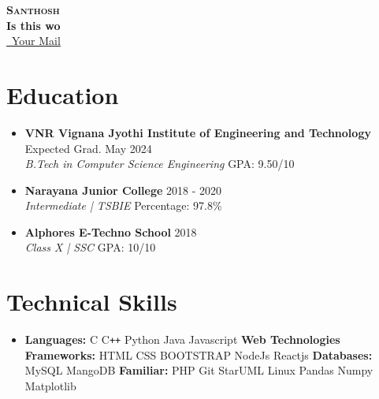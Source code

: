 \documentclass[letterpaper,5pt]{article}
\begin{document}
    \begin{center}
      \textbf{\Huge \scshape Santhosh} \\ \vspace{5pt}
      \textbf{\large Is this wo} \\ \vspace{2pt}
      \href{mailto:mail@mail.com}{\raisebox{-0.05\height}\faEnvelope \ Your Mail} 
       \
       \
       \
    \end{center}

    
    \section{Education}
    \begin{itemize}
        \item
            \textbf{VNR Vignana Jyothi Institute of Engineering and Technology} \hfill Expected Grad. May 2024 \\
            \textit{B.Tech in Computer Science Engineering} \hfill GPA: 9.50/10
          \vspace*{-2mm}  
        \item
            \textbf{Narayana Junior College} \hfill 2018 - 2020 \\
            \textit{Intermediate | TSBIE} \hfill Percentage: 97.8\%
            \vspace*{-2mm}  
        \item
            \textbf{Alphores E-Techno School} \hfill 2018 \\
            \textit{Class X | SSC} \hfill GPA: 10/10
    \end{itemize}
    \vspace*{-6mm}  
    
    
    \section{Technical Skills}
        \begin{itemize}[leftmargin=0.15in,label={}]
          \item{
            \textbf{Languages: }{C \textbullet{} C\texttt{++} \textbullet{} Python \textbullet{} Java \textbullet{} Javascript \newline}
            \textbf{Web Technologies Frameworks: }{HTML  \textbullet CSS \textbullet{} BOOTSTRAP \textbullet{} NodeJs \textbullet{} Reactjs \newline}
            \textbf{Databases: }{MySQL \textbullet{} MangoDB \newline}
            \textbf{Familiar: }{PHP \textbullet{} Git \textbullet{} StarUML \textbullet{} Linux \textbullet{} Pandas \textbullet{} Numpy \textbullet{} Matplotlib } 
            
          }
          
        \end{itemize}
        \vspace*{-6mm}  
    
\end{document}
